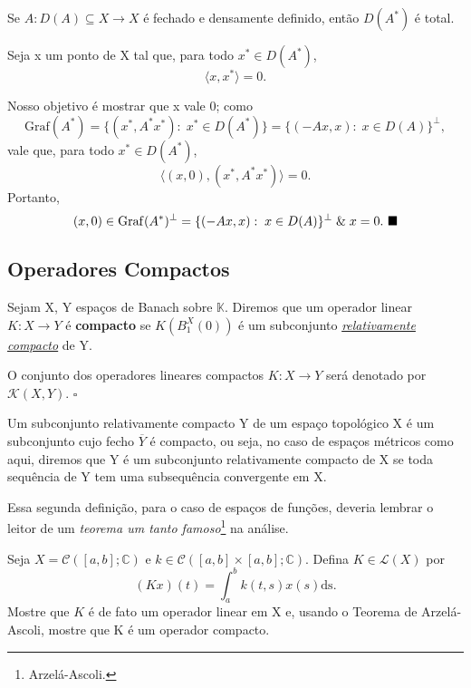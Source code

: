 \documentclass[../functional_analysis.tex]{subfiles}
\begin{document}
\begin{prop*}
	Se \(A:D(A)\subseteq X\rightarrow X\) é fechado e densamente definido, então \(D(A^{*})\) é total.
\end{prop*}
\begin{proof*}
	Seja x um ponto de X tal que, para todo \(x^{*}\in D(A^{*})\),
	\[
		\langle x, x^{*} \rangle=0.
	\]

	Nosso objetivo é mostrar que x vale 0; como
	\[
		\mathrm{Graf}(A^{*})=\{(x^{*}, A^{*}x^{*}):\; x^{*}\in D(A^{*})\}= \{(-Ax, x):\; x\in D(A)\}^{\perp },
	\]
	vale que, para todo \(x^{*}\in D(A^{*})\),
	\[
		\langle (x, 0), (x^{*}, A^{*}x^{*}) \rangle = 0.
	\]
	Portanto,
	\[
		(x, 0)\in \mathrm{Graf}(A^{*})^{\perp }=\{(-Ax, x):\; x\in D(A)\}^{\perp }\;\&\; x=0. \text{ $\blacksquare$}
	\]
\end{proof*}
\subsection{Operadores Compactos}
\begin{def*}
	Sejam X, Y espaços de Banach sobre \(\mathbb{K}\). Diremos que um operador linear \(K:X\rightarrow Y\) é \textbf{compacto} se \(K(B_{1}^{X}(0))\) é um subconjunto \hyperlink{relatively_compact}{\textit{relativamente compacto}} de Y.

	O conjunto dos operadores lineares compactos \(K:X\rightarrow Y\) será denotado por \(\mathcal{K}(X, Y)\). \(\square\)
\end{def*}
\begin{tcolorbox}[
		skin=enhanced,
		title=Lembrete!,
		after title={\hfill Conjunto Relativamente Compacto},
		fonttitle=\bfseries,
		sharp corners=downhill,
		colframe=black,
		colbacktitle=yellow!75!white,
		colback=yellow!30,
		colbacklower=black,
		coltitle=black,
		drop large lifted shadow
	]
	Um subconjunto \hypertarget{relatively_compact}{relativamente compacto} Y de um espaço topológico X é um subconjunto cujo fecho \(\overline{Y}\) é compacto, ou seja, no caso de espaços métricos como aqui, diremos que Y é um subconjunto relativamente compacto de X se toda sequência de Y tem uma subsequência convergente em X.

	Essa segunda definição, para o caso de espaços de funções, deveria lembrar o leitor de um \textit{teorema um tanto famoso}\footnote{Arzelá-Ascoli.} na análise.
\end{tcolorbox}
\begin{exr}
	Seja \(X=\mathcal{C}([a, b]; \mathbb{C})\) e \(k\in\mathcal{C}([a, b]\times [a, b]; \mathbb{C})\).
	Defina \(K\in \mathcal{L}(X)\) por
	\[
		(Kx)(t)=\int_{a}^{b}k(t, s)x(s) \mathrm{ds}.
	\]
	Mostre que \(K\) é de fato um operador linear em X e, usando o Teorema de Arzelá-Ascoli, mostre que K é um operador compacto.
\end{exr}
\end{document}
